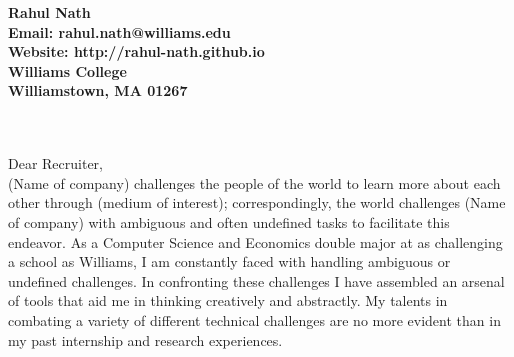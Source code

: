 \documentclass[11pt]{letter} %
\newcommand{\forceindent}{\leavevmode{\parindent=24pt\indent}}
\begin{document}



\begin{center}
\large\bf Rahul Nath \\ %
Email: rahul.nath@williams.edu \\ Website: http://rahul-nath.github.io \\ Williams College \\ Williamstown, MA 01267
\end{center}

\\ \\
Dear Recruiter,\\

\forceindent (Name of company) challenges the people of the world to learn more about each other through (medium of interest); correspondingly, the world challenges (Name of company) with ambiguous and often undefined tasks to facilitate this endeavor. As a Computer Science and Economics double major at as challenging a school as Williams, I am constantly faced with handling ambiguous or undefined challenges. In confronting these challenges I have assembled an arsenal of tools that aid me in thinking creatively and abstractly. My talents in combating a variety of different technical challenges are no more evident than in my past internship and research experiences. \\
\end{document}

